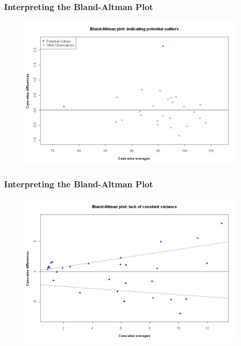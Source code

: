\documentclass[compress]{beamer}        %
\begin{document}
\begin{frame}
		\frametitle{Interpreting the Bland-Altman Plot}
	\begin{figure}
\centering
\includegraphics[width=0.85\linewidth]{BAOutliers}
\caption{}
\label{fig:BAOutliers}
\end{figure}

\end{frame}
\begin{frame}
	\frametitle{Interpreting the Bland-Altman Plot}
	\begin{figure}
\centering
\includegraphics[width=0.85\linewidth]{BAFanEffect}
\caption{}
\label{fig:BAFanEffect}
\end{figure}

\end{frame}
\end{document}
